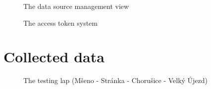 \documentclass[FM,BP,EN,fonts]{tulthesis}
\begin{document}
\begin{figure}[htbp]
    \centering
    \caption{The data source management view}
\end{figure}

\begin{figure}[htbp]
    \centering
    \caption{The access token system}
\end{figure}

\section{Collected data}
\begin{figure}[H]
    \centering
    \caption{The testing lap (Mšeno - Stránka - Chorušice - Velký Újezd)}
    \label{fig:test-lap}
\end{figure}
\end{document}
